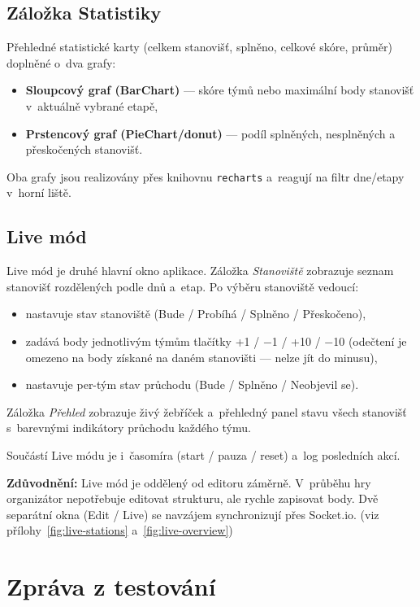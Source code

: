 ﻿\documentclass[a4paper,12pt]{article}
\begin{document}
\subsection{Záložka Statistiky}

Přehledné statistické karty (celkem stanovišť, splněno, celkové skóre,
průměr) doplněné o~dva grafy:
\begin{itemize}
  \item \textbf{Sloupcový graf (BarChart)} — skóre týmů nebo maximální body
    stanovišť v~aktuálně vybrané etapě,
  \item \textbf{Prstencový graf (PieChart/donut)} — podíl splněných,
    nesplněných a přeskočených stanovišť.
\end{itemize}
Oba grafy jsou realizovány přes knihovnu \texttt{recharts} a~reagují na
filtr dne/etapy v~horní liště.

\subsection{Live mód}

Live mód je druhé hlavní okno aplikace. Záložka \emph{Stanoviště} zobrazuje
seznam stanovišť rozdělených podle dnů a~etap. Po výběru stanoviště vedoucí:
\begin{itemize}
  \item nastavuje stav stanoviště (Bude / Probíhá / Splněno / Přeskočeno),
  \item zadává body jednotlivým týmům tlačítky +1 / $-$1 / +10 / $-$10
    (odečtení je omezeno na body získané na daném stanovišti — nelze jít do minusu),
  \item nastavuje per-tým stav průchodu (Bude / Splněno / Neobjevil se).
\end{itemize}
Záložka \emph{Přehled} zobrazuje živý žebříček a~přehledný panel stavu
všech stanovišť s~barevnými indikátory průchodu každého týmu.

Součástí Live módu je i~časomíra (start / pauza / reset) a~log posledních
akcí.

\textbf{Zdůvodnění:} Live mód je oddělený od editoru záměrně. V~průběhu hry
organizátor nepotřebuje editovat strukturu, ale rychle zapisovat body. Dvě
separátní okna (Edit / Live) se navzájem synchronizují přes Socket.io.
(viz přílohy~\ref{fig:live-stations} a~\ref{fig:live-overview})

\section{Zpráva z testování}
\end{document}
